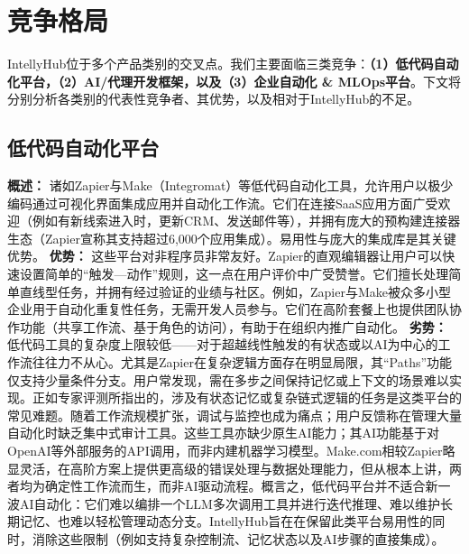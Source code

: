 \documentclass[11pt, a4paper, oneside]{article}
\begin{document}
\section{竞争格局}
IntellyHub位于多个产品类别的交叉点。我们主要面临三类竞争：\textbf{（1）低代码自动化平台，（2）AI/代理开发框架，以及（3）企业自动化 \& MLOps平台}。下文将分别分析各类别的代表性竞争者、其优势，以及相对于IntellyHub的不足。

\subsection{低代码自动化平台}

\textbf{概述：} 诸如Zapier与Make（Integromat）等低代码自动化工具，允许用户以极少编码通过可视化界面集成应用并自动化工作流。它们在连接SaaS应用方面广受欢迎（例如有新线索进入时，更新CRM、发送邮件等），并拥有庞大的预构建连接器生态（Zapier宣称其支持超过6,000个应用集成\cite{zapierApps}）。易用性与庞大的集成库是其关键优势。
\newline\newline
\textbf{优势：} 这些平台对非程序员非常友好。Zapier的直观编辑器让用户可以快速设置简单的“触发—动作”规则，这一点在用户评价中广受赞誉\cite{g2ZapierReviews}。它们擅长处理简单直线型任务，并拥有经过验证的业绩与社区。例如，Zapier与Make被众多小型企业用于自动化重复性任务，无需开发人员参与。它们在高阶套餐上也提供团队协作功能（共享工作流、基于角色的访问），有助于在组织内推广自动化\cite{zapierPricing}。
\newline\newline
\textbf{劣势：} 低代码工具的复杂度上限较低——对于超越线性触发的有状态或以AI为中心的工作流往往力不从心。尤其是Zapier在复杂逻辑方面存在明显局限，其“Paths”功能仅支持少量条件分支。用户常发现，需在多步之间保持记忆或上下文的场景难以实现。正如专家评测所指出的，涉及有状态记忆或复杂链式逻辑的任务是这类平台的常见难题。随着工作流规模扩张，调试与监控也成为痛点；用户反馈称在管理大量自动化时缺乏集中式审计工具\cite{g2ZapierReviews}。这些工具亦缺少原生AI能力；其AI功能基于对OpenAI等外部服务的API调用，而非内建机器学习模型\cite{zapierOpenAI}。Make.com相较Zapier略显灵活，在高阶方案上提供更高级的错误处理与数据处理能力\cite{g2MakeVsZapier}，但从根本上讲，两者均为确定性工作流而生，而非AI驱动流程。概言之，低代码平台并不适合新一波AI自动化：它们难以编排一个LLM多次调用工具并进行迭代推理、难以维护长期记忆、也难以轻松管理动态分支。IntellyHub旨在在保留此类平台易用性的同时，消除这些限制（例如支持复杂控制流、记忆状态以及AI步骤的直接集成）。
\end{document}
